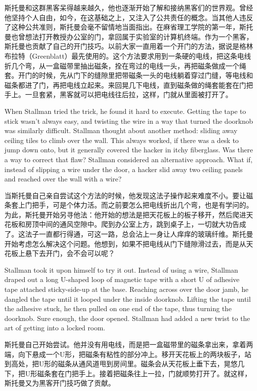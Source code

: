 \ifdefined\chs
斯托曼和这群黑客呆得越来越久，他也逐渐开始了解和接纳黑客们的世界观。曾经他坚持个人自由，如今，在这基础之上，又注入了公共责任的概念。当其他人违反了这种公共准则，斯托曼会毫不留情地当面指出。在麻省理工学院的第一年，斯托曼也曾想法打开教授办公室的门，拿回属于实验室的计算机终端。作为一个黑客，斯托曼也贡献了自己的开门技巧。以前大家一直用着一个开门的方法，据说是格林布拉特（Greenblatt）最先使用的。这个方法要求用到一条硬的电线，把这条电线折几个弯，从一盒磁带里抽出磁条，拴在弯过的电线一头，再把磁条做成一个绳套。开门的时候，先从门下的缝隙里把带磁条一头的电线躺着穿过门缝，等电线和磁条都进了门，再把电线立起来。来回晃几下电线，直到磁条做的绳套能套在门把手上。一旦套紧，黑客就可以把电线往后拉，这样，门就从里面被打开了。
\fi

\ifdefined\eng
When Stallman tried the trick, he found it hard to execute. Getting the tape to stick wasn't always easy, and twisting the wire in a way that turned the doorknob was similarly difficult. Stallman thought about another method: sliding away ceiling tiles to climb over the wall. This always worked, if there was a desk
to jump down onto, but it generally covered the hacker in itchy fiberglass.  Was there a way to correct that flaw?  Stallman considered an alternative approach. What if, instead of slipping a wire under the door, a hacker slid away two ceiling panels and reached over the wall with a wire?
\fi

\ifdefined\chs
当斯托曼自己亲自尝试这个方法的时候，他发现这法子操作起来难度不小。要让磁条套上门把手，可是个体力活。而之前要怎么把电线折出几个弯，也是有学问的。为此，斯托曼开始另寻他法：他开始的想法是把天花板上的板子移开，然后爬进天花板和房顶中间的通风空隙中。爬到办公室上方，跳到桌子上，一切就大功告成了。这法子一直都行得通，可这一路，总会沾上一身让人痒痒的玻璃纤维。斯托曼开始考虑怎么解决这个问题。他想到，如果不把电线从门下缝隙滑过去，而是从天花板上悬下去开门，会不会可以呢？
\fi

\ifdefined\eng
Stallman took it upon himself to try it out. Instead of using a wire, Stallman draped out a long U-shaped loop of magnetic tape with a short U of adhesive tape attached sticky-side-up at the base. Reaching across over the door jamb, he dangled the tape until it looped under the inside doorknob. Lifting the tape until the adhesive stuck, he then pulled on one end of the tape, thus turning the doorknob. Sure enough, the door opened. Stallman had added a new twist to the art of getting into a locked room.
\fi

\ifdefined\chs
斯托曼自己开始尝试。他并没有用电线，而是把一盒磁带里的磁条拿出来，拿着两端，向下悬成一个U形，把磁条有粘性的部分冲上。移开天花板上的两块板子，站到高处，把U形的磁条从通风道甩到房间里。磁条会从天花板上垂下去，晃悠几下，把U形磁条套在门把手上。接着把磁条往上一拉，门就顺势打开了。就这样，斯托曼又为黑客开门技巧做了贡献。
\fi

